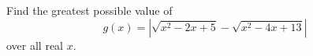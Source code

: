 Find the greatest possible value of
\[
g(x)=\left|\sqrt{x^2-2x+5}-\sqrt{x^2-4x+13}\right|
\]
over all real \(x\).
